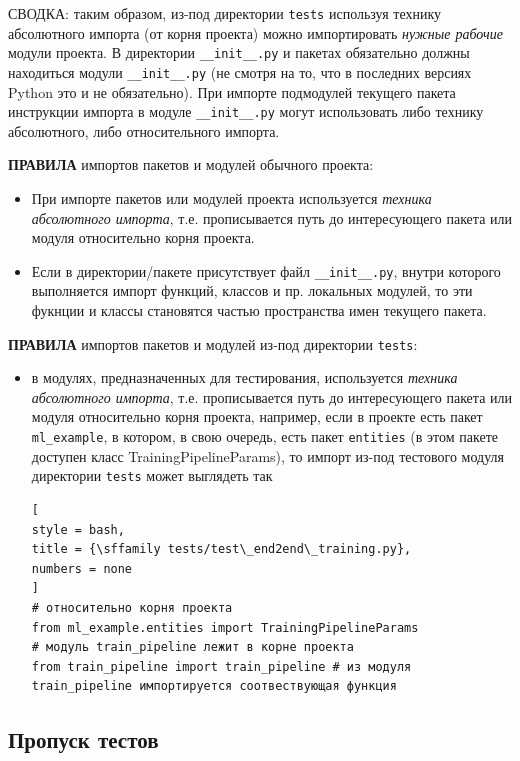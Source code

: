 \documentclass[%
	11pt,
	a4paper,
	utf8,
		]{article}
\begin{document}
СВОДКА: таким образом, из-под директории \texttt{tests} используя технику абсолютного импорта (от корня проекта) можно импортировать \emph{нужные рабочие} модули проекта. В директории \verb|__init__.py| и пакетах обязательно должны находиться модули \verb|__init__.py| (не смотря на то, что в последних версиях Python это и не обязательно). При импорте подмодулей текущего пакета инструкции импорта в модуле \verb|__init__.py| могут использовать либо технику абсолютного, либо относительного импорта.

\textbf{ПРАВИЛА} импортов пакетов и модулей обычного проекта:
\begin{itemize}
	\item При импорте пакетов или модулей проекта используется \emph{техника абсолютного импорта}, т.е. прописывается путь до интересующего пакета или модуля относительно корня проекта.
	
	\item Если в директории/пакете присутствует файл \verb|__init__.py|, внутри которого выполняется импорт функций, классов и пр. локальных модулей, то эти фукнции и классы становятся частью пространства имен текущего пакета.
\end{itemize}

\textbf{ПРАВИЛА} импортов пакетов и модулей из-под директории \texttt{tests}:
\begin{itemize}
	\item в модулях, предназначенных для тестирования, используется \emph{техника абсолютного импорта}, т.е. прописывается путь до интересующего пакета или модуля относительно корня проекта, например, если в проекте есть пакет \texttt{ml\_example}, в котором, в свою очередь, есть пакет \texttt{entities} (в этом пакете доступен класс TrainingPipelineParams), то импорт из-под тестового модуля директории \texttt{tests} может выглядеть так
\begin{lstlisting}[
style = bash,
title = {\sffamily tests/test\_end2end\_training.py},
numbers = none	
]
# относительно корня проекта
from ml_example.entities import TrainingPipelineParams
# модуль train_pipeline лежит в корне проекта
from train_pipeline import train_pipeline # из модуля train_pipeline импортируется соотвествующая функция
\end{lstlisting}
\end{itemize}


\subsection{Пропуск тестов}
\end{document}
